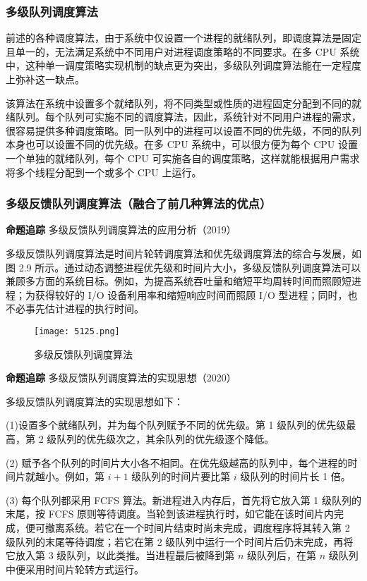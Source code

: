 \documentclass{ctexbook}
\begin{document}
	\subsubsection{多级队列调度算法}
	
	前述的各种调度算法，由于系统中仅设置一个进程的就绪队列，即调度算法是固定且单一的，无法满足系统中不同用户对进程调度策略的不同要求。在多 CPU 系统中，这种单一调度策略实现机制的缺点更为突出，多级队列调度算法能在一定程度上弥补这一缺点。
	
	该算法在系统中设置多个就绪队列，将不同类型或性质的进程固定分配到不同的就绪队列。每个队列可实施不同的调度算法，因此，系统针对不同用户进程的需求，很容易提供多种调度策略。同一队列中的进程可以设置不同的优先级，不同的队列本身也可以设置不同的优先级。在多 CPU 系统中，可以很方便为每个 CPU 设置一个单独的就绪队列，每个 CPU 可实施各自的调度策略，这样就能根据用户需求将多个线程分配到一个或多个 CPU 上运行。
	
	\subsubsection{多级反馈队列调度算法（融合了前几种算法的优点）}
	
	\textbf{命题追踪} 多级反馈队列调度算法的应用分析（2019）
	
	多级反馈队列调度算法是时间片轮转调度算法和优先级调度算法的综合与发展，如图 2.9 所示。通过动态调整进程优先级和时间片大小，多级反馈队列调度算法可以兼顾多方面的系统目标。例如，为提高系统吞吐量和缩短平均周转时间而照顾短进程；为获得较好的 I/O 设备利用率和缩短响应时间而照顾 I/O 型进程；同时，也不必事先估计进程的执行时间。
	
	\begin{figure}[H]
		\centering
		\texttt{[image: 5125.png]}
		\caption{多级反馈队列调度算法}
		\label{fig:multilevel_feedback_queue}
	\end{figure}
	
	\textbf{命题追踪} 多级反馈队列调度算法的实现思想（2020）
	
	多级反馈队列调度算法的实现思想如下：
	
	(1)设置多个就绪队列，并为每个队列赋予不同的优先级。第 1 级队列的优先级最高，第 2 级队列的优先级次之，其余队列的优先级逐个降低。
	
	(2) 赋予各个队列的时间片大小各不相同。在优先级越高的队列中，每个进程的时间片就越小。例如，第 $i+1$ 级队列的时间片要比第 $i$ 级队列的时间片长 1 倍。
	
	(3) 每个队列都采用 FCFS 算法。新进程进入内存后，首先将它放入第 1 级队列的末尾，按 FCFS 原则等待调度。当轮到该进程执行时，如它能在该时间片内完成，便可撤离系统。若它在一个时间片结束时尚未完成，调度程序将其转入第 2 级队列的末尾等待调度；若它在第 2 级队列中运行一个时间片后仍未完成，再将它放入第 3 级队列，以此类推。当进程最后被降到第 $n$ 级队列后，在第 $n$ 级队列中便采用时间片轮转方式运行。
	
\end{document}

